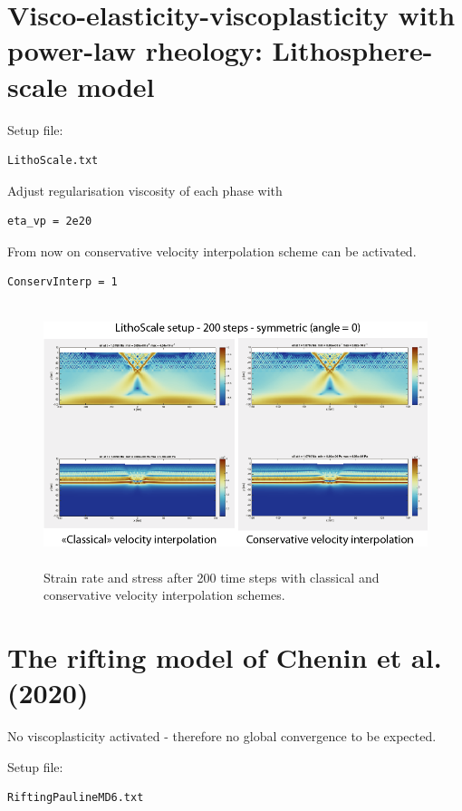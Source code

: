 \documentclass[12pt,english,openany]{scrbook}
\begin{document}
\section{Visco-elasticity-viscoplasticity with power-law rheology: Lithosphere-scale model}

Setup file:
\begin{verbatim} 
LithoScale.txt
\end{verbatim}

Adjust regularisation viscosity of each phase with
\begin{verbatim} 
eta_vp = 2e20
\end{verbatim}

From now on conservative velocity interpolation scheme can be activated.
\begin{verbatim} 
ConservInterp = 1
\end{verbatim}


\begin{figure}[ht!]
\centerline{\includegraphics[height=3.0in]{./Figures/LithoScale_MDOODZ.png}}
\caption{Strain rate and stress after 200 time steps with classical and conservative velocity interpolation schemes.}
\label{LithoScale_MDOODZ}
\end{figure}

\section{The rifting model of Chenin et al. (2020)}

No viscoplasticity activated - therefore no global convergence to be expected.

Setup file:
\begin{verbatim} 
RiftingPaulineMD6.txt
\end{verbatim}
\end{document}
